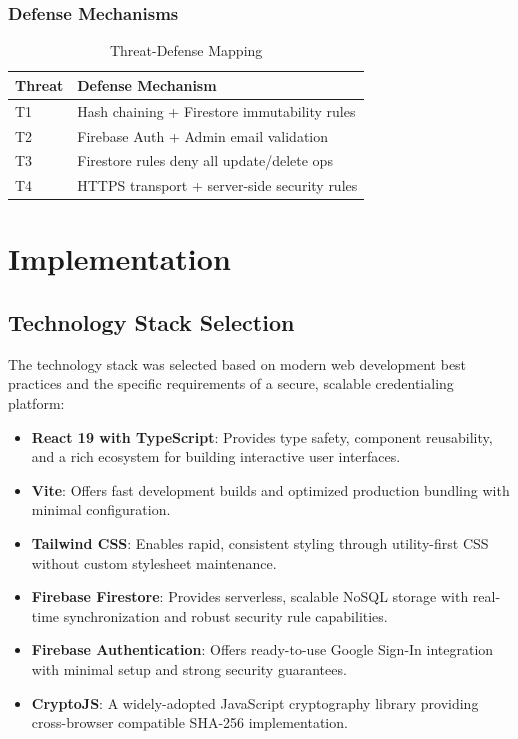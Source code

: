 \documentclass[10pt,twocolumn,a4paper]{article}
\begin{document}
\subsubsection{Defense Mechanisms}

\begin{table}[H]
    \centering
    \caption{Threat-Defense Mapping}
    \label{tab:defense}
    \begin{tabular}{@{}lp{5cm}@{}}
        \toprule
        \textbf{Threat} & \textbf{Defense Mechanism} \\
        \midrule
        T1 & Hash chaining + Firestore immutability rules \\
        T2 & Firebase Auth + Admin email validation \\
        T3 & Firestore rules deny all update/delete ops \\
        T4 & HTTPS transport + server-side security rules \\
        \bottomrule
    \end{tabular}
\end{table}

\section{Implementation}

\subsection{Technology Stack Selection}

The technology stack was selected based on modern web development best practices and the specific requirements of a secure, scalable credentialing platform:

\begin{itemize}
    \item \textbf{React 19 with TypeScript}: Provides type safety, component reusability, and a rich ecosystem for building interactive user interfaces.
    \item \textbf{Vite}: Offers fast development builds and optimized production bundling with minimal configuration.
    \item \textbf{Tailwind CSS}: Enables rapid, consistent styling through utility-first CSS without custom stylesheet maintenance.
    \item \textbf{Firebase Firestore}: Provides serverless, scalable NoSQL storage with real-time synchronization and robust security rule capabilities.
    \item \textbf{Firebase Authentication}: Offers ready-to-use Google Sign-In integration with minimal setup and strong security guarantees.
    \item \textbf{CryptoJS}: A widely-adopted JavaScript cryptography library providing cross-browser compatible SHA-256 implementation.
\end{itemize}
\end{document}
